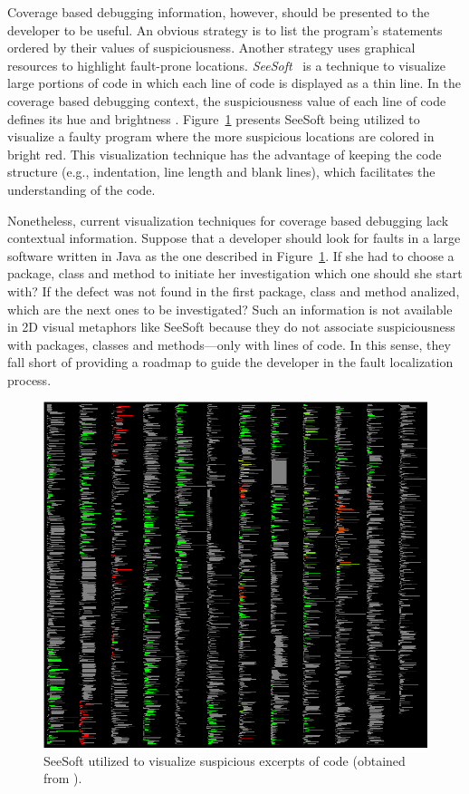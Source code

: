 Coverage based debugging information, however, should be presented to the
developer to be useful. An obvious strategy is to list the program's statements
ordered by their values of suspiciousness. Another strategy uses graphical
resources to highlight fault-prone locations.
\textit{SeeSoft}~\cite{eick1992seesoft} is a technique to visualize large
portions of code in which each line of code is displayed as a thin line.
 In the coverage based debugging context, the
suspiciousness value of each line of code defines its hue and brightness
\cite{jones2002visualization}. Figure~\ref{fig:seesoft} presents SeeSoft being
utilized to visualize a faulty program where the more suspicious locations are
colored in bright red. This visualization technique has the advantage of keeping
the code structure (e.g., indentation, line length and blank lines), which
facilitates the understanding of the code.

Nonetheless, current visualization techniques for coverage based debugging lack
contextual information. Suppose that a developer should look for faults in a
large software written in Java as the one described in Figure~\ref{fig:seesoft}.
If she had to choose a package, class and method to initiate her investigation
which one should she start with? If the defect was not found in the first
package, class and method analized, which are the next ones to be investigated?
Such an information is not available in 2D visual metaphors like SeeSoft because
they do not associate suspiciousness with packages, classes and methods---only
with lines of code. In this sense, they fall short of providing a roadmap to
guide the developer in the fault localization process.

\begin{center}
\begin{figure}[h!]
\centerline{\includegraphics[scale=.7]{figures/eick1992seesoft}}
\caption{SeeSoft utilized to visualize suspicious excerpts of code (obtained from \cite{jones2002visualization}).}\label{fig:seesoft}
\end{figure}
\end{center}

